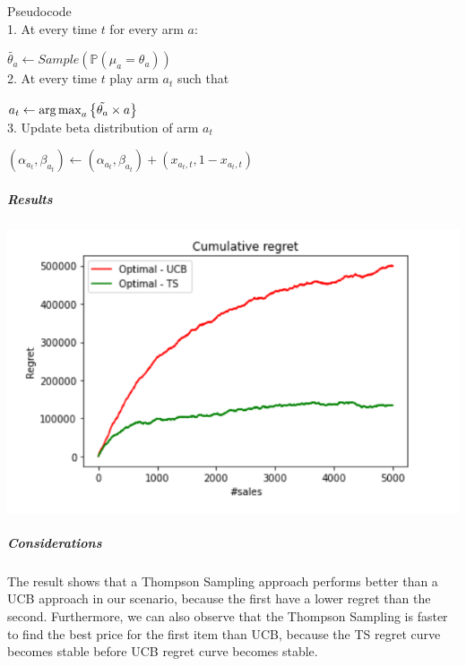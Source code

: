 Pseudocode\\

1. At every time $t$ for every arm $a$:

$\tilde{\theta_{a}} \leftarrow Sample(\mathbb P(\mu_{a}=\theta_{a}))$ \\

2. At every time $t$ play arm $a_{t}$ such that 

$a_{t} \leftarrow \operatorname{arg\,max}_a \left\{ \tilde{\theta_{a}} \times a \right\} $ \\

3.  Update beta distribution of arm $a_{t}$

$(\alpha_{a_{t}}, \beta_{a_{t}}) \leftarrow (\alpha_{a_{t}}, \beta_{a_{t}}) + (x_{a_{t},t}, 1 - x_{a_{t},t})$


\subparagraph*{Results}
\begin{center}
	\includegraphics[scale=1.2]{Images/n3}
\end{center}
\subparagraph*{Considerations}
The result shows that a Thompson Sampling approach performs better than a UCB approach in our scenario, because the first have a lower regret than the second. Furthermore, we can also observe that the Thompson Sampling is faster to find the best price for the first item than UCB, because the TS regret curve becomes stable before UCB regret curve becomes stable.